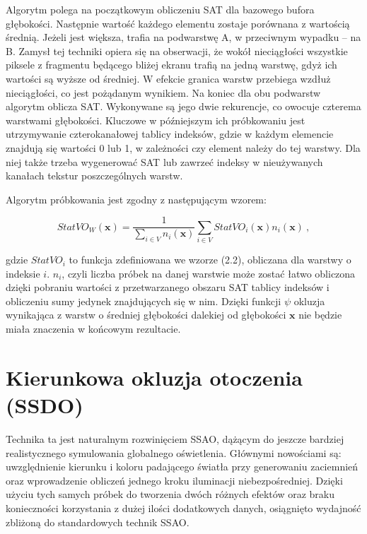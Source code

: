 		
		Algorytm polega na początkowym obliczeniu SAT dla bazowego bufora głębokości. Następnie wartość każdego elementu zostaje porównana z wartością średnią. Jeżeli jest większa, trafia na podwarstwę A, w przeciwnym wypadku -- na B. Zamysł tej techniki opiera się na obserwacji, że wokół nieciągłości wszystkie piksele z fragmentu będącego bliżej ekranu trafią na jedną warstwę, gdyż ich wartości są wyższe od średniej. W efekcie granica warstw przebiega wzdłuż nieciągłości, co jest pożądanym wynikiem. Na koniec dla obu podwarstw algorytm oblicza SAT. Wykonywane są jego dwie rekurencje, co owocuje czterema warstwami głębokości. Kluczowe w późniejszym ich próbkowaniu jest utrzymywanie czterokanałowej tablicy indeksów, gdzie w każdym elemencie znajdują się wartości 0 lub 1, w zależności czy element należy do tej warstwy. Dla niej także trzeba wygenerować SAT lub zawrzeć indeksy w nieużywanych kanałach tekstur poszczególnych warstw.
		
		Algorytm próbkowania jest zgodny z następującym wzorem:
		
		\begin{equation}
		\mathit{StatVO}_{W}(\mathbf{x}) = \frac{1}{\sum_{i \in V} n_{i}(\mathbf{x})} \sum_{i \in V}\mathit{StatVO}_{i}(\mathbf{x})n_{i}(\mathbf{x})\ ,
		\end{equation} 
		
		gdzie \(\mathit{StatVO}_{i}\) to funkcja zdefiniowana we wzorze (2.2), obliczana dla warstwy o indeksie \(i\). \(n_{i}\), czyli liczba próbek na danej warstwie może zostać łatwo obliczona dzięki pobraniu wartości z przetwarzanego obszaru SAT tablicy indeksów i obliczeniu sumy jedynek znajdujących się w nim. Dzięki funkcji \(\psi\) okluzja wynikająca z warstw o średniej głębokości dalekiej od głębokości \(\mathbf{x}\) nie będzie miała znaczenia w końcowym rezultacie.
	
	\section{Kierunkowa okluzja otoczenia (SSDO)}
	\label{t:teoria:ssdo}
	
	Technika ta jest naturalnym rozwinięciem SSAO, dążącym do jeszcze bardziej realistycznego symulowania globalnego oświetlenia. Głównymi nowościami są: uwzględnienie kierunku i koloru padającego światła przy generowaniu zaciemnień oraz wprowadzenie obliczeń jednego kroku iluminacji niebezpośredniej. Dzięki użyciu tych samych próbek do tworzenia dwóch różnych efektów oraz braku konieczności korzystania z dużej ilości dodatkowych danych, osiągnięto wydajność zbliżoną do standardowych technik SSAO.
	
